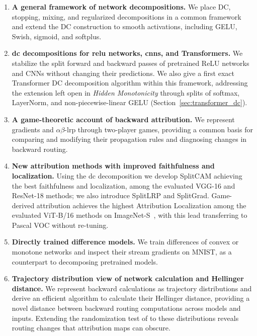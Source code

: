 \begin{enumerate}
    \item \textbf{A general framework of network decompositions.}
    We place DC, stopping, mixing, and regularized decompositions in a common framework and extend the DC construction to smooth activations, including GELU, Swish, sigmoid, and softplus.

    \item \textbf{\acs{dc} decompositions for \acs{relu} networks, \acsp{cnn}, and Transformers.}
    We stabilize the split forward and backward passes of pretrained ReLU networks and CNNs without changing their predictions. We also give a first exact Transformer DC decomposition algorithm within this framework, addressing the extension left open in \emph{Hidden Monotonicity} through splits of softmax, LayerNorm, and non-piecewise-linear GELU (Section~\ref{sec:transformer_dc}).

    \item \textbf{A game-theoretic account of backward attribution.}
    We represent gradients and $\alpha\beta$-\ac{lrp} through two-player games, providing a common basis for comparing and modifying their propagation rules and diagnosing changes in backward routing.

    \item \textbf{New attribution methods with improved faithfulness and localization.}
    Using the \acs{dc} decomposition we develop SplitCAM achieving the best faithfulness and localization, among the evaluated VGG-16 and ResNet-18 methods; we also introduce SplitLRP and SplitGrad. Game-derived attribution achieves the highest Attribution Localization among the evaluated ViT-B/16 methods on ImageNet-S~\parencite{gao2022luss}, with this lead transferring to Pascal VOC without re-tuning.

    \item \textbf{Directly trained difference models.}
    We train differences of convex or monotone networks and inspect their stream gradients on MNIST, as a counterpart to decomposing pretrained models.

    \item \textbf{Trajectory distribution view of network calculation and Hellinger distance.}
    We represent backward calculations as trajectory distributions and derive an efficient algorithm to calculate their Hellinger distance, providing a novel distance between backward routing computations across models and inputs. Extending the randomization test of \textcite{Adebayo2018sanity} to these distributions reveals routing changes that attribution maps can obscure.
\end{enumerate}

